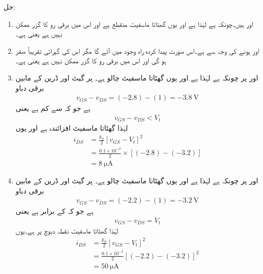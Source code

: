 حل:
\begin{enumerate}
\item
{} اور   ہیں۔چونکہ   ہے لہٰذا  ہے اور یوں گھٹاتا ماسفیٹ منقطع ہے اور اس میں برقی رو کا گزر ممکن نہیں ہے یعنی  ہے۔
\item
{} اور   ہونے کی وجہ سے  ہے۔اس صورت پیدا کردہ راہ وجود میں آئے گا مگر اس کی گہرائی تقریباً صفر ہو گی اور اس میں برقی رو کا گزر ممکن نہیں ہے یعنی   ہے۔

\item

 اور  	 پر چونکہ   ہے لہٰذا  ہے اور یوں گھٹاتا ماسفیٹ چالو ہے۔  پر گیٹ اور ڈرین کے مابین برقی دباو
\begin{align*}
v_{GS}-v_{DS}=(-2.8)-(1)=\SI{-3.8}{\volt}
\end{align*}
ہے جو کہ   سے کم ہے یعنی
\begin{align*}
v_{GS}-v_{DS}<V_t
\end{align*}
لہٰذا گھٹاتا ماسفیٹ افزائندہ ہے اور یوں
\begin{align*}
i_{DS}&=\frac{k_n}{2} \left[v_{GS}-V_t \right]^2 \\
&=\frac{0.1 \times 10^{-3}}{2} \times \left[(-2.8)-(-3.2) \right]\\
&=\SI{8}{\micro \ampere}
\end{align*}
\item
{} اور  	 پر چونکہ    ہے لہٰذا  ہے اور یوں گھٹاتا ماسفیٹ چالو ہے۔  پر گیٹ اور ڈرین کے مابین برقی دباو
\begin{align*}
v_{GS}-v_{DS}=(-2.2)-(1)=\SI{-3.2}{\volt}
\end{align*}
ہے جو کہ  کے برابر ہے  یعنی
\begin{align*}
v_{GS}-v_{DS}=V_t
\end{align*}
لہٰذا گھٹاتا ماسفیٹ نقطہ دبوچ پر ہے۔یوں
\begin{align*}
i_{DS}&=\frac{k_n}{2} \left[v_{GS}-V_t \right ]^2  \\
&=\frac{0.1 \times 10^{-3}}{2} \left[(-2.2)-(-3.2) \right ]^2 \\
&=\SI{50}{\micro \ampere}
\end{align*}

\end{enumerate}
